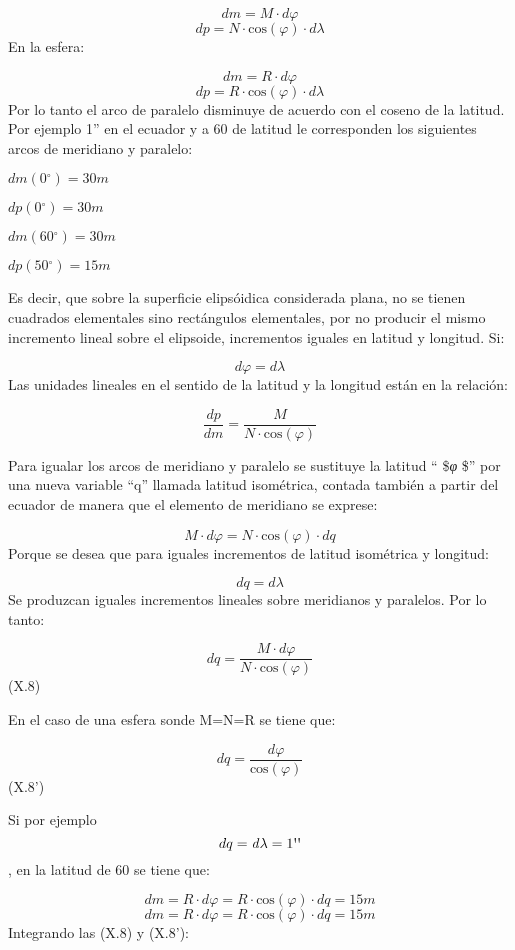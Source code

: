 \documentclass[]{article}
\begin{document}
\[dm=M\cdot d\varphi \] \[dp=N\cdot \text{cos}\left(\varphi
\right)\cdot d\lambda \] En la esfera:

\[dm=R\cdot d\varphi \] \[dp=R\cdot \text{cos}\left(\varphi
\right)\cdot d\lambda \] Por lo tanto el arco de paralelo disminuye de
acuerdo con el coseno de la latitud. Por ejemplo 1'' en el ecuador y a
60 de latitud le corresponden los siguientes arcos de meridiano y
paralelo:

\(dm\left(0{}^{\circ}\right)=\text{30}m\)

\(dp\left(0{}^{\circ}\right)=\text{30}m\)

\(dm\left(\text{60}{}^{\circ}\right)=\text{30}m\)

\(dp\left(\text{50}{}^{\circ}\right)=\text{15}m\)

Es decir, que sobre la superficie elipsóidica considerada plana, no se
tienen cuadrados elementales sino rectángulos elementales, por no
producir el mismo incremento lineal sobre el elipsoide, incrementos
iguales en latitud y longitud. Si:

\[d\varphi =d\lambda \] Las unidades lineales en el sentido de la
latitud y la longitud están en la relación:

\[\frac{dp}{dm}=\frac{M}{N\cdot \text{cos}\left(\varphi \right)}\]

Para igualar los arcos de meridiano y paralelo se sustituye la latitud
`` \$\emph{φ} \$'' por una nueva variable ``q'' llamada latitud
isométrica, contada también a partir del ecuador de manera que el
elemento de meridiano se exprese:

\[M\cdot d\varphi =N\cdot \text{cos}\left(\varphi \right)\cdot
dq\] Porque se desea que para iguales incrementos de latitud isométrica
y longitud:

\[dq=d\lambda \] Se produzcan iguales incrementos lineales sobre
meridianos y paralelos. Por lo tanto:

\[dq=\frac{M\cdot d\varphi }{N\cdot
\text{cos}\left(\varphi \right)}\] (X.8)

En el caso de una esfera sonde M=N=R se tiene que:

\[dq=\frac{\mathit{d\varphi
}}{\text{cos}\left(\varphi \right)}\] (X.8')

Si por ejemplo \[dq=\mathit{d\lambda
}=1\text{{\textquotesingle}{\textquotesingle}}\], en la latitud de 60 se
tiene que:

\[dm=R\cdot d\varphi =R\cdot
\text{cos}\left(\varphi \right)\cdot
dq=\text{15}m\] \[dm=R\cdot d\varphi =R\cdot
\text{cos}\left(\varphi \right)\cdot
dq=\text{15}m\] Integrando las (X.8) y (X.8'):
\end{document}

